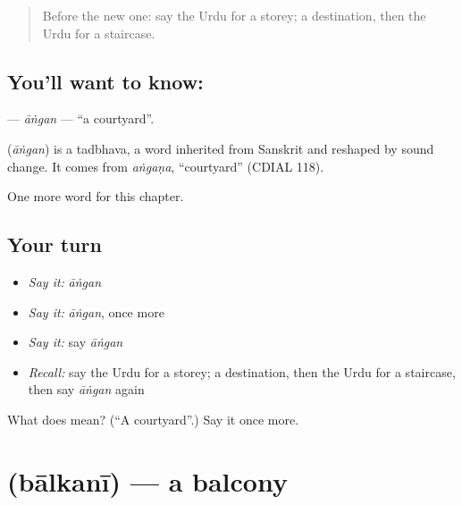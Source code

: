 \label{lesson:UR-C219-angan}



\begin{quote}
Before the new one: say the Urdu for a storey; a destination, then the Urdu for a staircase.
\end{quote}

\subsection*{You'll want to know: }
\textbf{} — \emph{āṅgan} — \textquotedblleft{}a courtyard\textquotedblright{}.

\begin{cousinweb}
\textbf{} (\emph{āṅgan}) is a tadbhava, a word inherited from Sanskrit and reshaped by sound change. It comes from \emph{aṅgaṇa}, \textquotedblleft{}courtyard\textquotedblright{} (CDIAL 118).
\end{cousinweb}

\begin{grammarlens}[title={What you've built}]
One more word for this chapter.
\end{grammarlens}

\subsection*{Your turn}
\begin{itemize}
\raggedright
  \item \emph{Say it:} \emph{āṅgan}
  \item \emph{Say it:} \emph{āṅgan}, once more
  \item \emph{Say it:} say \emph{āṅgan}
  \item \emph{Recall:} say the Urdu for a storey; a destination, then the Urdu for a staircase, then say \emph{āṅgan} again
\end{itemize}

\begin{tcolorbox}[breakable,colback=teal!4,colframe=teal!35!black,title={Before you move on}]
What does  mean? (\textquotedblleft{}A courtyard\textquotedblright{}.) Say it once more.
\end{tcolorbox}
\section[\texorpdfstring{\ur{بالکنی} (bālkanī)}{بالکنی (bālkanī)}]{ (bālkanī) — a balcony}

